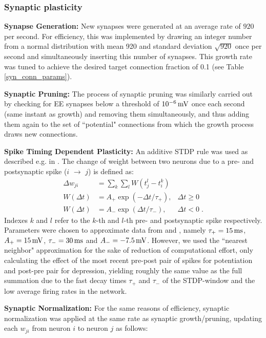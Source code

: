 \documentclass[10pt,letterpaper]{article}
\begin{document}
\subsubsection*{Synaptic plasticity}\label{Section_Methods_Syn_Plast}
\textbf{Synapse Generation:} New synapses were generated at an average rate of $920$ per second. For efficiency, this was implemented by drawing an integer number from a normal distribution with mean 920 and standard deviation $\sqrt{920}$ once per second and simultaneously inserting this number of synapses. This growth rate was tuned to achieve the desired target connection fraction of 0.1 (see Table \ref{syn_conn_params}).

\textbf{Synaptic Pruning:} The process of synaptic pruning was similarly carried out by checking for EE synapses below a threshold of $\rm 10^{-6}\, mV$ once each second (same instant as growth) and removing them simultaneously, and thus adding them again to the set of ``potential" connections from which the growth process draws new connections.

\textbf{Spike Timing Dependent Plasticity:} An additive STDP rule was used as described e.g. in \cite{Zhang_STDP}. The change of weight between two neurons due to a pre- and postsynaptic spike ($i$ $\rightarrow$ $j$) is defined as:
\begin{align}
\Delta w_{ji} &= \sum_k \sum_l W(t_j^l - t_i^k) \label{STDP_rule} \\
W(\Delta t) &= A_{+} \exp(-\Delta t / \tau_{+}), & \Delta t \geq 0 \label{STDP_pos} \\
W(\Delta t) &= A_{-} \exp(\Delta t / \tau_{-}), & \Delta t < 0 \; . \label{STDP_neg}
\end{align}
Indexes $k$ and $l$ refer to the $k$-th and $l$-th pre- and postsynaptic spike respectively. Parameters were chosen to approximate data from \cite{Bi_Poo_STDP} and \cite{Froemke_STDP}, namely $\tau_{+} = \rm 15\, ms$, $A_{+} =\rm 15\, mV$, $\tau_{-} =\rm 30\, ms$ and $A_{-} =\rm -7.5\, mV$. However, we used the ``nearest neighbor" approximation for the sake of reduction of computational effort, only calculating the effect of the most recent pre-post pair of spikes for potentiation and post-pre pair for depression, yielding roughly the same value as the full summation due to the fast decay times $\tau_{+}$ and $\tau_{-}$ of the STDP-window and the low average firing rates in the network.

\textbf{Synaptic Normalization:} For the same reasons of efficiency, synaptic normalization was applied at the same rate as synaptic growth/pruning, updating each $w_{ji}$ from neuron $i$ to neuron $j$ as follows:
\end{document}

